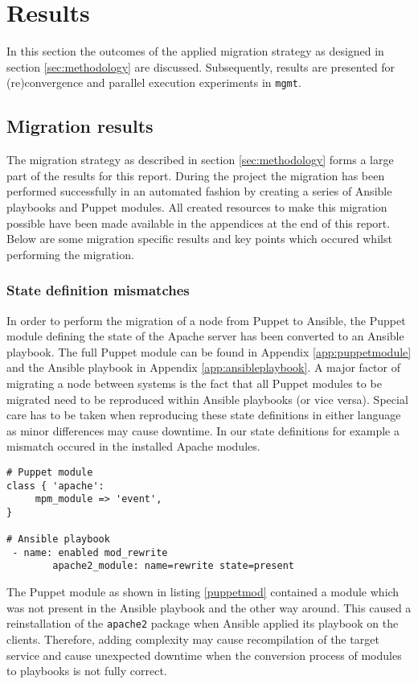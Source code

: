 \section{Results}\label{sec:results}
In this section the outcomes of the applied migration strategy as designed in section \ref{sec:methodology} are discussed. Subsequently, results are presented for (re)convergence and parallel execution experiments in \texttt{mgmt}.

\subsection{Migration results}
The migration strategy as described in section \ref{sec:methodology} forms a large part of the results for this report. During the project the migration has been performed successfully in an automated fashion by creating a series of Ansible playbooks and Puppet modules. All created resources to make this migration possible have been made available in the appendices at the end of this report. Below are some migration specific results and key points which occured whilst performing the migration. 

\subsubsection{State definition mismatches}
In order to perform the migration of a node from Puppet to Ansible, the Puppet module defining the state of the Apache server has been converted to an Ansible playbook. The full Puppet module can be found in Appendix \ref{app:puppetmodule} and the Ansible playbook in Appendix \ref{app:ansibleplaybook}. A major factor of migrating a node between systems is the fact that all Puppet modules to be migrated need to be reproduced within Ansible playbooks (or vice versa). Special care has to be taken when reproducing these state definitions in either language as minor differences may cause downtime. In our state definitions for example a mismatch occured in the installed Apache modules.
\\
\begin{lstlisting}[caption={Module mismatch in state definitions},label=puppetmod]
# Puppet module
class { 'apache':
     mpm_module => 'event',
}

# Ansible playbook
 - name: enabled mod_rewrite
        apache2_module: name=rewrite state=present
\end{lstlisting}

\noindent
The Puppet module as shown in listing \ref{puppetmod} contained a module which was not present in the Ansible playbook and the other way around. This caused a reinstallation of the \texttt{apache2} package when Ansible applied its playbook on the clients. Therefore, adding complexity may cause recompilation of the target service and cause unexpected downtime when the conversion process of modules to playbooks is not fully correct.

